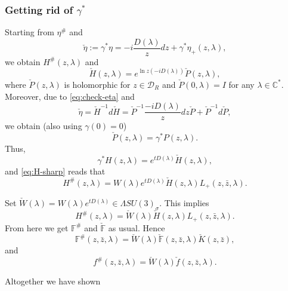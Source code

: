 \documentclass[a4paper,11pt]{amsart}
\theoremstyle{definition}
\numberwithin{equation}{section}
\begin{document}
\subsubsection{\textbf{Getting rid of \texorpdfstring{$\gamma^*$}{}}}

Starting from $\eta^{\#}$ and 
\begin{equation}\label{eq:check-eta}
\check{\eta}:=\gamma^*\eta=-i\frac{D(\lambda)}{z}dz+\gamma^*\eta_{+}(z,\lambda),
\end{equation}
we obtain $H^{\#}(z,\lambda)$ and
\begin{equation}\label{eq:H_check}
\check{H}(z,\lambda)=e^{\ln z (-iD(\lambda))}\check{P}(z,\lambda),
\end{equation}
where $\check{P}(z,\lambda)$ is holomorphic for $z\in \mathcal{D}_R$ and $\check{P}(0,\lambda)=I$ for any $\lambda\in \mathbb{C}^*$.
Moreover, due to \eqref{eq:check-eta} and 
$$\check{\eta}=\check{H}^{-1} d\check{H}=\check{P}^{-1}\frac{-iD(\lambda)}{z} dz\check{P}+\check{P}^{-1}d\check{P},$$
we obtain (also using $\gamma (0) = 0$)
$$\check{P}(z,\lambda)=\gamma^* P(z,\lambda).$$
Thus,
$$\gamma^*H(z,\lambda)=e^{tD(\lambda)} \check{H}(z,\lambda),$$
and \eqref{eq:H-sharp} reads that
$$H^{\#}(z,\lambda)=W(\lambda) e^{tD(\lambda)} \check{H}(z,\lambda) L_{+}(z,\bar{z},\lambda).$$

Set $\check{W}(\lambda)=W(\lambda) e^{tD(\lambda)}\in \Lambda SU(3)_{\sigma}$. This implies 
\begin{equation}
H^{\#}(z,\lambda)=\check{W}(\lambda)\check{H}(z,\lambda)L_{+}(z,\bar{z},\lambda).
\end{equation}
From here we get $\mathbb{F}^{\#}$ and $\check{\mathbb{F}}$ as usual. Hence
\begin{equation}
\mathbb{F}^{\#}(z,\bar{z},\lambda)=\check{W}(\lambda)\check{\mathbb{F}}(z,\bar{z},\lambda)\check{K}(z,\bar{z}),
\end{equation}
and 
\begin{equation}
f^{\#}(z,\bar{z},\lambda)=\check{W}(\lambda)\check{f}(z,\bar{z},\lambda).
\end{equation}

Altogether we have shown
\end{document}
